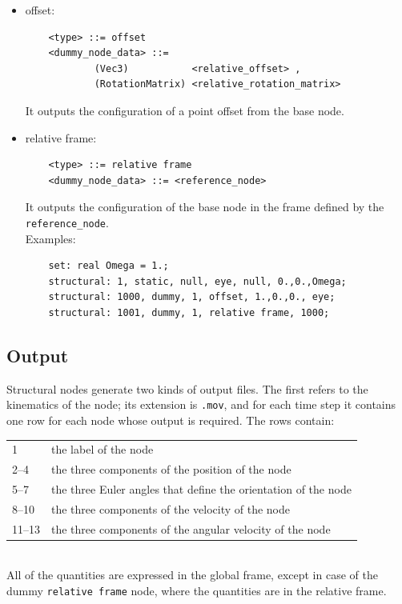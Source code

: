 \documentclass[10pt,dvips]{report}
\begin{document}
\begin{itemize}

    \item offset:
    \begin{verbatim}
    <type> ::= offset
    <dummy_node_data> ::=
            (Vec3)           <relative_offset> ,
            (RotationMatrix) <relative_rotation_matrix>
    \end{verbatim}
    It outputs the configuration of a point offset from the base node.
            
    \item relative frame:
    \begin{verbatim}
    <type> ::= relative frame
    <dummy_node_data> ::= <reference_node>
    \end{verbatim}
    It outputs the configuration of the base node in the frame defined
    by the {\tt reference\_node}.\\
    Examples:
    \begin{verbatim}
    set: real Omega = 1.;
    structural: 1, static, null, eye, null, 0.,0.,Omega;
    structural: 1000, dummy, 1, offset, 1.,0.,0., eye;
    structural: 1001, dummy, 1, relative frame, 1000;
    \end{verbatim}

\end{itemize}

\subsection{Output}
Structural nodes generate two kinds of output files. 
The first refers to the kinematics of the node; its extension is {\tt .mov},
and for each time step it contains one row for each node whose output is
required.
The rows contain: \vspace{2mm} \\
\begin{tabular}{ll}
    \hline
    1      & the label of the node \\
    2--4   & the three components of the position of the node \\
    5--7   & the three Euler angles that define the orientation of the node \\
    8--10  & the three components of the velocity of the node \\
    11--13 & the three components of the angular velocity of the node \\
    \hline
\end{tabular}\vspace{2mm}\\
All of the quantities are expressed in the global frame, except in case of
the dummy {\tt relative frame} node, where the quantities are in the
relative frame.
\end{document}
